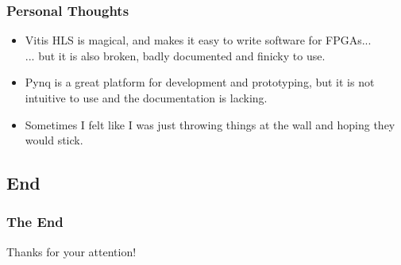 \documentclass{beamer}
\begin{document}
\begin{frame}
    \frametitle{Personal Thoughts}

    \begin{itemize}
         \item Vitis HLS is magical, and makes it easy to write software for FPGAs...\\... but it is also broken, badly documented and finicky to use.
         \item Pynq is a great platform for development and prototyping, but it is not intuitive to use and the documentation is lacking.
         \item Sometimes I felt like I was just throwing things at the wall and hoping they would stick.
    \end{itemize}
\end{frame}

\subsection{End}
\begin{frame}
    \frametitle{The End}

    \large Thanks for your attention!
\end{frame}
\end{document}
